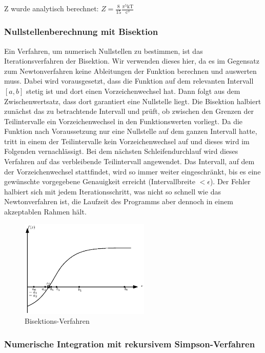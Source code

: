 \documentclass[10pt,a4paper]{article}
\begin{document}
Z wurde analytisch berechnet: $Z=\frac{8}{15}\frac{\pi^5 \mathrm{kT}}{\mathrm{c}^3}$

\subsubsection{Nullstellenberechnung mit Bisektion}

Ein Verfahren, um numerisch Nullstellen zu bestimmen, ist das Iterationsverfahren der Bisektion. Wir verwenden dieses hier, da es im Gegensatz zum Newtonverfahren keine Ableitungen der Funktion berechnen und auswerten muss. Dabei wird vorausgesetzt, dass die Funktion auf dem relevanten Intervall $[a,b]$ stetig ist und dort einen Vorzeichenwechsel hat. Dann folgt aus dem Zwischenwertsatz, dass dort garantiert eine Nullstelle liegt. Die Bisektion halbiert zunächst das zu betrachtende Intervall und prüft, ob zwischen den Grenzen der Teilintervalle ein Vorzeichenwechsel in den Funktionswerten vorliegt. Da die Funktion nach Voraussetzung nur eine Nullstelle auf dem ganzen Intervall hatte, tritt in einem der Teilintervalle kein Vorzeichenwechsel auf und dieses wird im Folgenden vernachlässigt. Bei dem nächsten Schleifendurchlauf wird dieses Verfahren auf das verbleibende Teilintervall angewendet. Das Intervall, auf dem der Vorzeichenwechsel stattfindet, wird so immer weiter eingeschränkt, bis es eine gewünschte vorgegebene Genauigkeit erreicht (Intervallbreite $<\epsilon$). 
Der Fehler halbiert sich mit jedem Iterationsschritt, was nicht so schnell wie das Newtonverfahren ist, die Laufzeit des Programms aber dennoch in einem akzeptablen Rahmen hält.
\begin{figure}[tbp]
\centering
\includegraphics[width=0.55\textwidth]{./figures/bisektion.eps}
\caption{Bisektions-Verfahren}
\label{fig:bisektion}
\end{figure}

\subsubsection{Numerische Integration mit rekursivem Simpson-Verfahren}
\end{document}
